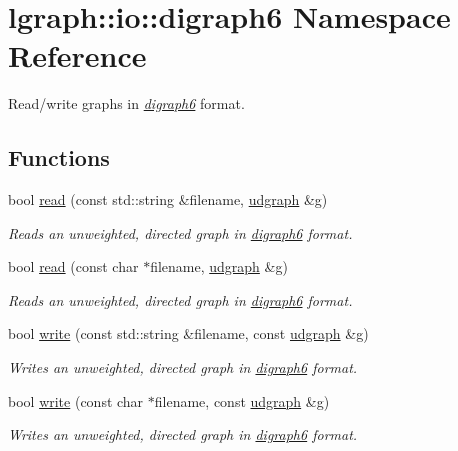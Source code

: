 \hypertarget{namespacelgraph_1_1io_1_1digraph6}{\section{lgraph\-:\-:io\-:\-:digraph6 Namespace Reference}
\label{namespacelgraph_1_1io_1_1digraph6}
}


Read/write graphs in {\itshape \hyperlink{namespacelgraph_1_1io_1_1digraph6}{digraph6}} format.  


\subsection*{Functions}
\begin{DoxyCompactItemize}
\item 
bool \hyperlink{namespacelgraph_1_1io_1_1digraph6_aac580c19909a943b8b18fcba9ecb6b16}{read} (const std\-::string \&filename, \hyperlink{classlgraph_1_1udgraph}{udgraph} \&g)
\begin{DoxyCompactList}\small\item\em Reads an unweighted, directed graph in {\itshape \hyperlink{namespacelgraph_1_1io_1_1digraph6}{digraph6}} format. \end{DoxyCompactList}\item 
bool \hyperlink{namespacelgraph_1_1io_1_1digraph6_ac04dcb134c80c54ad6637d9eb8340d0d}{read} (const char $\ast$filename, \hyperlink{classlgraph_1_1udgraph}{udgraph} \&g)
\begin{DoxyCompactList}\small\item\em Reads an unweighted, directed graph in {\itshape \hyperlink{namespacelgraph_1_1io_1_1digraph6}{digraph6}} format. \end{DoxyCompactList}\item 
bool \hyperlink{namespacelgraph_1_1io_1_1digraph6_a2d1f257a3a768ab0ea3d2ba0bc96665f}{write} (const std\-::string \&filename, const \hyperlink{classlgraph_1_1udgraph}{udgraph} \&g)
\begin{DoxyCompactList}\small\item\em Writes an unweighted, directed graph in {\itshape \hyperlink{namespacelgraph_1_1io_1_1digraph6}{digraph6}} format. \end{DoxyCompactList}\item 
bool \hyperlink{namespacelgraph_1_1io_1_1digraph6_a9cf136a86f4da536fd2a18d0a135bdec}{write} (const char $\ast$filename, const \hyperlink{classlgraph_1_1udgraph}{udgraph} \&g)
\begin{DoxyCompactList}\small\item\em Writes an unweighted, directed graph in {\itshape \hyperlink{namespacelgraph_1_1io_1_1digraph6}{digraph6}} format. \end{DoxyCompactList}\end{DoxyCompactItemize}


